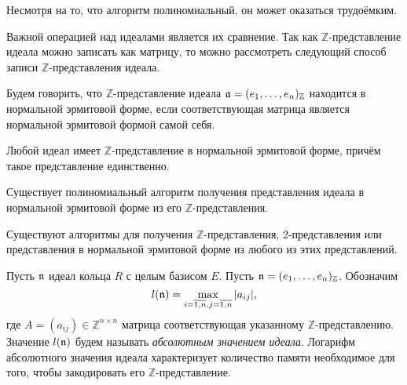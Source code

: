 \documentclass[_00_dissertation.tex]{subfiles}
\begin{document}
\begin{remark}
    Несмотря на то, что алгоритм полиномиальный, он может оказаться трудоёмким.
\end{remark}

Важной операцией над идеалами является их сравнение.
Так как $\mathbb{Z}$-представление идеала можно записать как матрицу, то можно рассмотреть следующий способ записи $\mathbb{Z}$-представления идеала.

\begin{definition}
    Будем говорить, что $\mathbb{Z}$-представление идеала $\mathfrak{a} = (e_1,\dots,e_n)_{\mathbb{Z}}$ находится в нормальной эрмитовой форме, если соответствующая матрица является нормальной эрмитовой формой самой себя.
\end{definition}

\begin{statement} \cite[с.~67]{source:Cohen}
    Любой идеал имеет $\mathbb{Z}$-представление в нормальной эрмитовой форме, причём такое представление единственно.
\end{statement}

\begin{statement} \cite[с.504]{source:Kannan}
    Существует полиномиальный алгоритм получения представления идеала в нормальной эрмитовой форме из его $\mathbb{Z}$-представления.
\end{statement}

\begin{corollary}
    Существуют алгоритмы для получения $\mathbb{Z}$-представления, 2-представления или представления в нормальной эрмитовой форме из любого из этих представлений.
\end{corollary}

\begin{definition}
    Пусть $\mathfrak{n}$ идеал кольца $R$ с целым базисом $E$.
    Пусть $\mathfrak{n} = (e_1, \dots, e_n)_{\mathbb{Z}}$.
    Обозначим
    \begin{equation*}
        l(\mathfrak{n}) = \max\limits_{i = \overline{1,n}, j = \overline{1,n}} |a_{ij}|, 
    \end{equation*}
    где $A = (a_{ij}) \in \mathbb{Z}^{n \times n}$ матрица соответствующая указанному $\mathbb{Z}$-представлению.
    Значение $l(\mathfrak{n})$ будем называть \emph{абсолютным значением идеала}.
    Логарифм абсолютного значения идеала характеризует количество памяти необходимое для того, чтобы закодировать его $\mathbb{Z}$-представление.
\end{definition}
\end{document}
